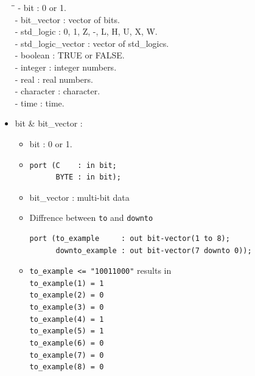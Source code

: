 \documentclass[a4paper]{article}
\begin{document}
\begin{itemize}
\begin{tabbing}
\hspace{2.4cm}\=\hspace{1.3cm}\=\kill
- bit  \> : 0 or 1. \>   \\ 
- bit\_vector  \> : vector of bits. \>  \\ 
- std\_logic  \> : 0, 1, Z, -, L, H, U, X, W. \>  \\ 
- std\_logic\_vector  \>  : vector of std\_logics. \>   \\
- boolean  \> : TRUE or FALSE. \>   \\ 
- integer  \> : integer numbers. \>   \\ 
- real  \> : real numbers. \>   \\ 
- character  \> : character. \>   \\ 
- time  \> : time. \>   \\ 


\end{tabbing} 


\item bit \& bit\_vector :
\begin{itemize}
\item bit : 0 or 1.

\item
\begin{verbatim}
port (C    : in bit;
      BYTE : in bit);
\end{verbatim}
\item bit\_vector : multi-bit data



\item Diffrence between \texttt{to} and \texttt{downto}
\begin{verbatim}
port (to_example     : out bit-vector(1 to 8);
      downto_example : out bit-vector(7 downto 0));
\end{verbatim}

\item \texttt{to\_example <= "10011000"} results in \\ \texttt{to\_example(1) = 1}\\
\texttt{to\_example(2) = 0}\\
\texttt{to\_example(3) = 0}\\
\texttt{to\_example(4) = 1}\\
\texttt{to\_example(5) = 1}\\
\texttt{to\_example(6) = 0}\\
\texttt{to\_example(7) = 0}\\
\texttt{to\_example(8) = 0}\\


\end{itemize}
\end{itemize}
\end{document}
